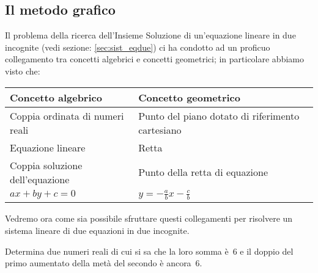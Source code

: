 % 
% 
% 

\subsection{Il metodo grafico}
Il problema della ricerca dell'Insieme Soluzione di
un'equazione lineare in due incognite (vedi sezione: \ref{sec:sist_eqdue}) 
ci ha condotto ad un proficuo collegamento tra concetti algebrici e 
concetti geometrici; in particolare abbiamo visto che:

\begin{center}
 \begin{tabularx}{.9\textwidth}{XX}
\toprule
 Concetto algebrico & Concetto geometrico\\
 \midrule
Coppia ordinata di numeri reali & Punto del piano dotato di riferimento 
cartesiano\\
Equazione lineare & Retta \\
Coppia soluzione dell'equazione& Punto della retta di equazione \\
$ax+by+c=0$ & $y=-{\frac{a}{b}}x-\frac{c}{b}$\\
\bottomrule
 \end{tabularx}

\end{center}
Vedremo ora come sia possibile sfruttare questi collegamenti per
risolvere un sistema lineare di due equazioni in due incognite.

\begin{problema}
Determina due numeri reali di cui si sa che la loro somma è~6 e il
doppio del primo aumentato della metà del secondo è ancora~6.
\end{problema}

